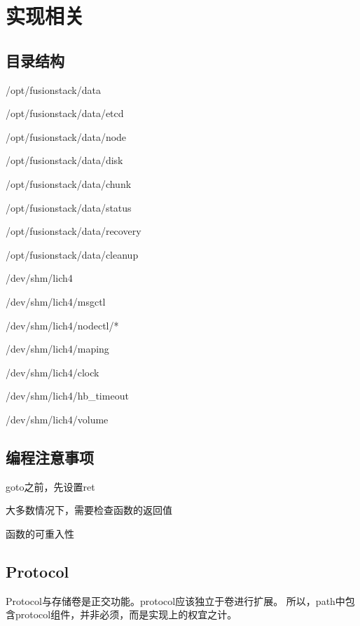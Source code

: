 \chapter{实现相关}

\section{目录结构}

\begin{enumbox}
\item /opt/fusionstack/data
\item /opt/fusionstack/data/etcd
\item /opt/fusionstack/data/node
\item /opt/fusionstack/data/disk
\item /opt/fusionstack/data/chunk
\item /opt/fusionstack/data/status
\item /opt/fusionstack/data/recovery
\item /opt/fusionstack/data/cleanup
\item 
\item /dev/shm/lich4
\item /dev/shm/lich4/msgctl
\item /dev/shm/lich4/nodectl/*
\item /dev/shm/lich4/maping
\item /dev/shm/lich4/clock
\item /dev/shm/lich4/hb\_timeout
\item /dev/shm/lich4/volume
\end{enumbox}

\section{编程注意事项}

\begin{compactitem}
\item goto之前，先设置ret
\item 大多数情况下，需要检查函数的返回值
\item 函数的可重入性
\end{compactitem}

\section{Protocol}

Protocol与存储卷是正交功能。protocol应该独立于卷进行扩展。
所以，path中包含protocol组件，并非必须，而是实现上的权宜之计。

